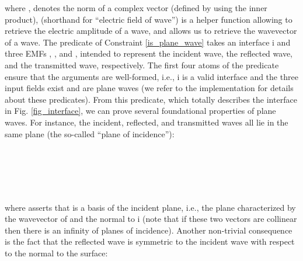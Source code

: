 \documentclass{llncs}
\begin{document}
{\noindent where ,
 denotes the norm of a complex vector (defined by using the inner product),
 (shorthand for ``electric field of wave'') is a helper function allowing to retrieve the electric amplitude of a wave,
and  allows us to retrieve the wavevector of a wave.
The predicate of Constraint \ref{is_plane_wave} takes an interface \hol i and three EMFs , , and ,
intended to represent the incident wave, the reflected wave, and the transmitted wave, respectively.
The first four atoms of the predicate ensure that the arguments are well-formed,
i.e., \hol i is a valid interface and the three input fields exist and are plane waves
(we refer to the implementation for details about these predicates).
From this predicate, which totally describes the interface in Fig. \ref{fig_interface}, we can prove several foundational properties of plane waves.
For instance, the incident, reflected, and transmitted waves all lie in the same plane (the so-called ``plane of incidence''):
 \begin{theorem} \ \vspace{.2cm}\\
	\label{thm_incidence}
  \ \\
   \ \\
  \ \\
\end{theorem}
\noindent where  asserts that  is a basis of the incident plane,
i.e., the plane characterized by the wavevector of  and the normal to \hol i
(note that if these two vectors are collinear then there is an infinity of planes of incidence).
Another non-trivial consequence is the fact that the reflected wave is symmetric to the incident wave with respect to the normal to the surface:
 \begin{theorem} \ \vspace{.2cm}\\ 
	\label{thm_reflection}
  \ \\

\end{theorem}}
\end{document}
